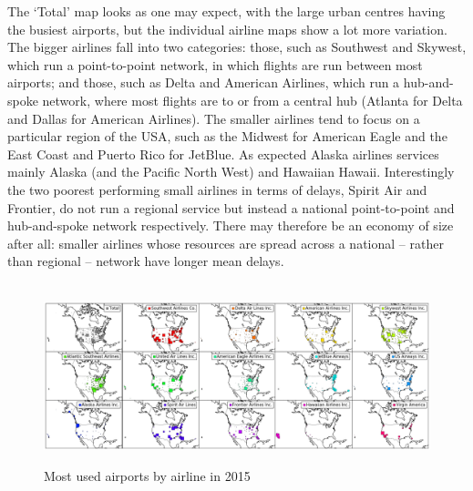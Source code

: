 \documentclass[a4paper]{article}
\begin{document}
The `Total' map looks as one may expect, with the large urban centres having the busiest airports, but the individual airline maps show a lot more variation. The bigger airlines fall into two categories: those, such as Southwest and Skywest, which run a point-to-point network, in which flights are run between most airports; and those, such as Delta and American Airlines, which run a hub-and-spoke network, where most flights are to or from a central hub (Atlanta for Delta and Dallas for American Airlines). The smaller airlines tend to focus on a particular region of the USA, such as the Midwest for American Eagle and the East Coast and Puerto Rico for JetBlue. As expected Alaska airlines services mainly Alaska (and the Pacific North West) and Hawaiian Hawaii. Interestingly the two poorest performing small airlines in terms of delays, Spirit Air and Frontier, do not run a regional service but instead a national point-to-point and hub-and-spoke network respectively. There may therefore be an economy of size after all: smaller airlines whose resources are spread across a national -- rather than regional -- network have longer mean delays.

\begin{figure}[h]
\centering
\hbox{\hspace{-0.7in}
\includegraphics[width=1.2\textwidth]{../figures/exploration/airports_carrier.png}}
\caption{Most used airports by airline in 2015}
\label{airportscarrier}
\end{figure}
\end{document}
